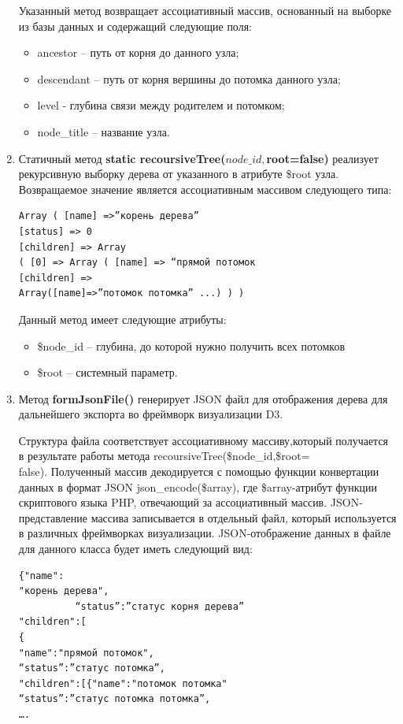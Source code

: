 \documentclass[a4paper,14pt]{extreport}
\theoremstyle{definition}
\begin{document}
\begin{enumerate}
Указанный метод возвращает ассоциативный массив, основанный на выборке из базы данных и содержащий следующие поля:
\begin{itemize}
\item ancestor – путь от корня до данного узла;
\item descendant – путь от корня вершины до потомка данного узла;
\item level - глубина связи между родителем и потомком;
\item node\_title – название узла.
\end{itemize}
\item Статичный метод \textbf{static recoursiveTree($node\_id,$root=false)} реализует рекурсивную выборку дерева от указанного в атрибуте \$root узла. Возвращаемое значение является ассоциативным массивом следующего типа:
\begin{verbatim}Array ( [name] =>”корень дерева”
[status] => 0
[children] => Array
( [0] => Array ( [name] => “прямой потомок
[children] =>
Array([name]=>”потомок потомка” ...) ) )\end{verbatim}
Данный метод имеет следующие атрибуты:
\begin{itemize}
\item \$node\_id – глубина, до которой нужно получить всех потомков
\item \$root – системный параметр.
\end{itemize}
\item Метод \textbf{formJsonFile()} генерирует JSON файл для отображения дерева для дальнейшего экспорта во фреймворк визуализации D3.

Структура файла соответствует ассоциативному массиву,который получается в результате работы метода recoursiveTree(\$node\_id,\$root=\\false).
Полученный массив декодируется с помощью функции конвертации данных в формат JSON json\_encode(\$array), где \$array-атрибут функции скриптового языка PHP, отвечающий за ассоциативный массив. JSON-представление массива записывается в отдельный файл, который используется в различных фреймворках визуализации. JSON-отображение данных в файле для данного класса будет иметь следующий вид:
\begin{verbatim}{"name":
"корень дерева",
          “status”:”статус корня дерева”
"children":[
{
"name":"прямой потомок",
“status”:”статус потомка”,
"children":[{"name":"потомок потомка"
“status”:”статус потомка потомка”,
….\end{verbatim}


\end{enumerate}
\end{document}
